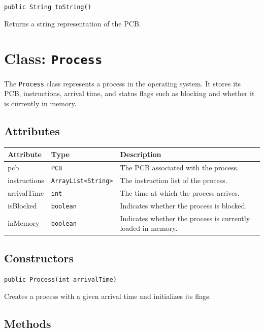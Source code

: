 \documentclass[12pt,a4paper]{article}
\begin{document}
\begin{signaturebox}
\texttt{public String toString()}
\end{signaturebox}
Returns a string representation of the PCB.

\section{Class: \texttt{Process}}

\begin{purposebox}
The \texttt{Process} class represents a process in the operating system. It stores its PCB, instructions, arrival time, and status flags such as blocking and whether it is currently in memory.
\end{purposebox}

\subsection{Attributes}

\begin{tabularx}{\textwidth}{p{4cm} p{3cm} Y}
\toprule
\textbf{Attribute} & \textbf{Type} & \textbf{Description} \\
\midrule
pcb & \texttt{PCB} & The PCB associated with the process. \\
instructions & \texttt{ArrayList<String>} & The instruction list of the process. \\
arrivalTime & \texttt{int} & The time at which the process arrives. \\
isBlocked & \texttt{boolean} & Indicates whether the process is blocked. \\
inMemory & \texttt{boolean} & Indicates whether the process is currently loaded in memory. \\
\bottomrule
\end{tabularx}

\subsection{Constructors}

\begin{signaturebox}
\texttt{public Process(int arrivalTime)}
\end{signaturebox}

Creates a process with a given arrival time and initializes its flags.

\subsection{Methods}
\end{document}
